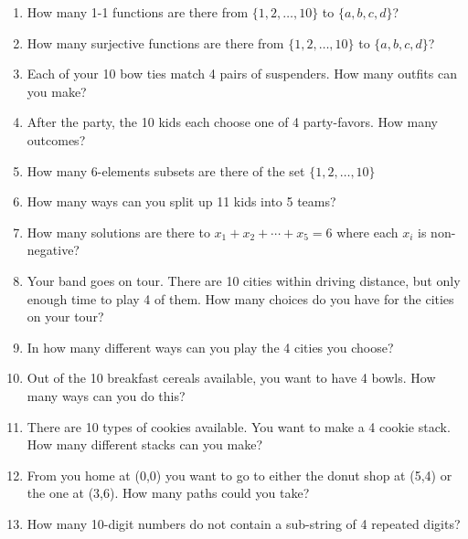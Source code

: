 \documentclass[10pt,]{book}
\theoremstyle{plain}
\theoremstyle{definition}
\theoremstyle{definition}
\theoremstyle{definition}
\numberwithin{equation}{section}
\begin{document}
\begin{exerciselist}
\begin{enumerate}[label=(\alph*)]
\item\hypertarget{li-680}{}
                How many 1-1 functions are there from \(\{1,2,\ldots, 10\}\) to \(\{a,b,c,d\}\)?
\item\hypertarget{li-681}{}
                How many surjective functions are there from \(\{1,2,\ldots, 10\}\) to \(\{a,b,c,d\}\)?
\item\hypertarget{li-682}{}
                Each of your 10 bow ties match 4 pairs of suspenders. How many outfits can you make?
\item\hypertarget{li-683}{}
                After the party, the 10 kids each choose one of 4 party-favors. How many outcomes?
\item\hypertarget{li-684}{}
                How many 6-elements subsets are there of the set \(\{1,2,\ldots, 10\}\)
\item\hypertarget{li-685}{}
                How many ways can you split up 11 kids into 5 teams?
\item\hypertarget{li-686}{}
                How many solutions are there to \(x_1 + x_2 + \cdots + x_5 = 6\) where each \(x_i\) is non-negative?
\item\hypertarget{li-687}{}
                Your band goes on tour. There are 10 cities within driving distance, but only enough time to play 4 of them. How many choices do you have for the cities on your tour?
\item\hypertarget{li-688}{}
                In how many different ways can you play the 4 cities you choose?
\item\hypertarget{li-689}{}
                Out of the 10 breakfast cereals available, you want to have 4 bowls. How many ways can you do this?
\item\hypertarget{li-690}{}
                There are 10 types of cookies available. You want to make a 4 cookie stack. How many different stacks can you make?
\item\hypertarget{li-691}{}
                From you home at (0,0) you want to go to either the donut shop at (5,4) or the one at (3,6). How many paths could you take?
\item\hypertarget{li-692}{}
                How many 10-digit numbers do not contain a sub-string of 4 repeated digits?
\end{enumerate}


\end{exerciselist}
\end{document}
